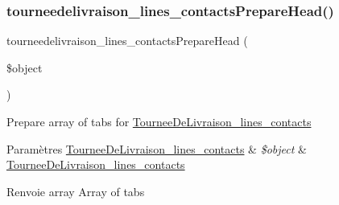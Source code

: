\subsubsection{\texorpdfstring{tourneedelivraison\+\_\+lines\+\_\+contacts\+Prepare\+Head()}{tourneedelivraison\_lines\_contactsPrepareHead()}}
{\footnotesize\ttfamily tourneedelivraison\+\_\+lines\+\_\+contacts\+Prepare\+Head (\begin{DoxyParamCaption}\item[{}]{\$object }\end{DoxyParamCaption})}

Prepare array of tabs for \hyperlink{classTourneeDeLivraison__lines__contacts}{Tournee\+De\+Livraison\+\_\+lines\+\_\+contacts}


\begin{DoxyParams}[1]{Paramètres}
\hyperlink{classTourneeDeLivraison__lines__contacts}{Tournee\+De\+Livraison\+\_\+lines\+\_\+contacts} & {\em \$object} & \hyperlink{classTourneeDeLivraison__lines__contacts}{Tournee\+De\+Livraison\+\_\+lines\+\_\+contacts} \\
\hline
\end{DoxyParams}
\begin{DoxyReturn}{Renvoie}
array Array of tabs 
\end{DoxyReturn}
